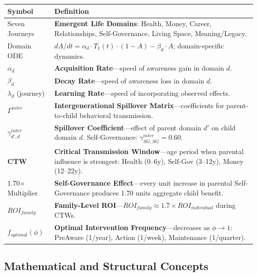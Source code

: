 \begin{longtable}{@{}p{2.8cm}p{10cm}@{}}
\toprule
\textbf{Symbol} & \textbf{Definition} \\
\midrule
\endhead
Seven Journeys & \textbf{Emergent Life Domains}: Health, Money, Career, Relationships, Self-Governance, Living Space, Meaning/Legacy. \\[6pt]
Domain ODE & $dA/dt = \alpha_d \cdot T_1(t) \cdot (1-A) - \beta_d \cdot A$; domain-specific dynamics. \\[6pt]
$\alpha_d$ & \textbf{Acquisition Rate}---speed of awareness gain in domain $d$. \\[6pt]
$\beta_d$ & \textbf{Decay Rate}---speed of awareness loss in domain $d$. \\[6pt]
$\lambda_d$ (journey) & \textbf{Learning Rate}---speed of incorporating observed effects. \\[6pt]
$\Gamma^{inter}$ & \textbf{Intergenerational Spillover Matrix}---coefficients for parent-to-child behavioral transmission. \\[6pt]
$\gamma^{inter}_{d',d}$ & \textbf{Spillover Coefficient}---effect of parent domain $d'$ on child domain $d$. Self-Governance: $\gamma^{inter}_{SG,SG} = 0.60$. \\[6pt]
\textbf{CTW} & \textbf{Critical Transmission Window}---age period when parental influence is strongest: Health (0--6y), Self-Gov (3--12y), Money (12--22y). \\[6pt]
1.70× Multiplier & \textbf{Self-Governance Effect}---every unit increase in parental Self-Governance produces 1.70 units aggregate child benefit. \\[6pt]
$ROI_{family}$ & \textbf{Family-Level ROI}---$ROI_{family} \approx 1.7 \times ROI_{individual}$ during CTWs. \\[6pt]
$f_{optimal}(\phi)$ & \textbf{Optimal Intervention Frequency}---decreases as $\phi \to 1$: PreAware (1/year), Action (1/week), Maintenance (1/quarter). \\
\bottomrule
\end{longtable}

\subsection{Mathematical and Structural Concepts}


